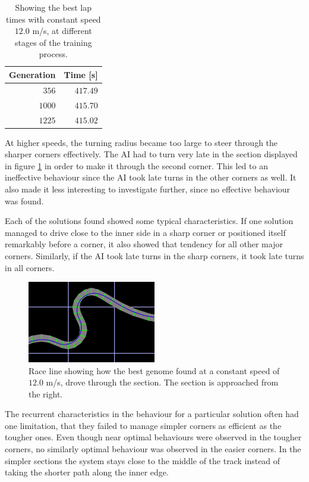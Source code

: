 \begin{table}[h!] 
  \centering
  \begin{tabular}{rr}
    \toprule
    Generation & Time [s]\\
    \midrule
    $356$  & $417.49$ \\
    $1000$ & $415.70$ \\
    $1225$ & $415.02$ \\
    \bottomrule
  \end{tabular}
  \caption{Showing the best lap times with constant speed $12.0$ m/s, at different stages of the training process.}
  \label{tab:constanttrackdata}
\end{table}

\noindent
At higher speeds, the turning radius became too large to steer through the sharper corners effectively. The AI had to turn very late in the section displayed in figure \ref{fig:constantspeedsection} in order to make it through the second corner. This led to an ineffective behaviour since the AI took late turns in the other corners as well. It also made it less interesting to investigate further, since no effective behaviour was found. 

Each of the solutions found showed some typical characteristics. If one solution managed to drive close to the inner side in a sharp corner or positioned itself remarkably before a corner, it also showed that tendency for all other major corners. Similarly, if the AI took late turns in the sharp corners, it took late turns in all corners.

\begin{figure}
\includegraphics[width=0.5\textwidth]{report/images/constant_speed_section}
\centering
\caption{Race line showing how the best genome found at a constant speed of $12.0$ m/s, drove through the section. The section is approached from the right.}
\label{fig:constantspeedsection}
\vspace{-5pt}
\end{figure}

The recurrent characteristics in the behaviour for a particular solution often had one limitation, that they failed to manage simpler corners as efficient as the tougher ones. Even though near optimal behaviours were observed in the tougher corners, no similarly optimal behaviour was observed in the easier corners. In the simpler sections the system stays close to the middle of the track instead of taking the shorter path along the inner edge. 

